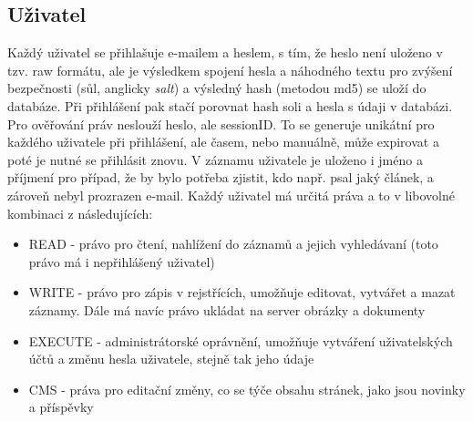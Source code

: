 \subsection{Uživatel}
Každý uživatel se přihlašuje e-mailem a heslem, s tím, že heslo není uloženo v tzv. raw formátu, ale
je výsledkem spojení hesla a náhodného textu pro zvýšení bezpečnosti (sůl, anglicky \textit{salt}) a
výsledný hash (metodou md5) se uloží do databáze. Při přihlášení pak stačí porovnat hash soli a hesla s údaji v databázi.
Pro ověřování práv neslouží heslo, ale sessionID. To se generuje unikátní pro každého uživatele při přihlášení, ale
časem, nebo manuálně, může expirovat a poté je nutné se přihlásit znovu.
V záznamu uživatele je uloženo i jméno a příjmení pro případ, že by bylo
potřeba zjistit, kdo např. psal jaký článek, a zároveň nebyl prozrazen e-mail.
Každý uživatel má určitá práva a to v libovolné kombinaci z následujících:
\begin{itemize}
     \item READ - právo pro čtení, nahlížení do záznamů a jejich vyhledávaní (toto právo má i nepřihlášený uživatel)
     \item WRITE - právo pro zápis v rejstřících, umožňuje editovat, vytvářet a mazat záznamy. Dále má navíc právo ukládat na server obrázky a dokumenty
     \item EXECUTE - administrátorské oprávnění, umožňuje vytváření uživatelských účtů a změnu hesla uživatele, stejně tak jeho údaje
     \item CMS - práva pro editační změny, co se týče obsahu stránek, jako jsou novinky a příspěvky
\end{itemize}
